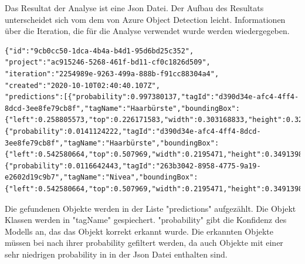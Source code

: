 Das Resultat der Analyse ist eine Json Datei. 
Der Aufbau des Resultats unterscheidet sich vom dem von Azure Object Detection leicht. Informationen über die Iteration, die für die Analyse verwendet wurde werden wiedergegeben. 

\begin{lstlisting}
{"id":"9cb0cc50-1dca-4b4a-b4d1-95d6bd25c352",
"project":"ac915246-5268-461f-bd11-cf0c1826d509",
"iteration":"2254989e-9263-499a-888b-f91cc88304a4",
"created":"2020-10-10T02:40:40.107Z",
"predictions":[{"probability":0.997380137,"tagId":"d390d34e-afc4-4ff4-8dcd-3ee8fe79cb8f","tagName":"Haarbürste","boundingBox":{"left":0.258805573,"top":0.226171583,"width":0.303168833,"height":0.329167157}},
{"probability":0.0141124222,"tagId":"d390d34e-afc4-4ff4-8dcd-3ee8fe79cb8f","tagName":"Haarbürste","boundingBox":{"left":0.542580664,"top":0.507969,"width":0.2195471,"height":0.3491398}},
{"probability":0.0116642443,"tagId":"263b3042-8958-4775-9a19-e2602d19c9b7","tagName":"Nivea","boundingBox":{"left":0.542580664,"top":0.507969,"width":0.2195471,"height":0.3491398}}]}
\end{lstlisting}

Die gefundenen Objekte werden in der Liste "predictions" aufgezählt. Die Objekt Klassen werden in "tagName" gespiechert. "probability" gibt die Konfidenz des Modells an, das das Objekt korrekt erkannt wurde. Die erkannten Objekte müssen bei nach ihrer probability gefiltert werden, da auch Objekte mit einer sehr niedrigen probability in in der Json Datei enthalten sind. 